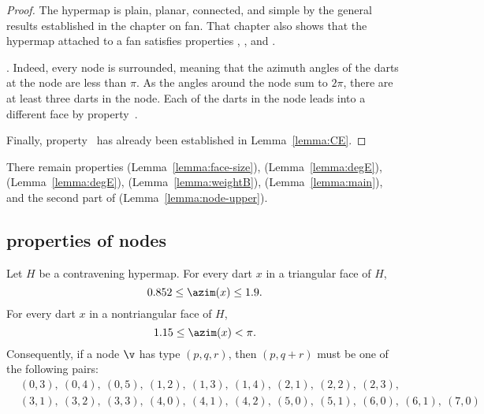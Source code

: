 \begin{proof}
  The hypermap is plain, planar, connected, and simple by the general
  results established in the chapter on fan.  That chapter also shows
  that the hypermap attached to a fan satisfies properties
  , , and .

  .  Indeed, every node is
  surrounded, meaning that the azimuth angles of the darts at the
  node are less than $\pi$.  As the angles around the node sum to
  $2\pi$, there are at least three darts in the node. Each of the
  darts in the node leads into a different face by
  property~.

  Finally, property~ has already been established in
  Lemma~\ref{lemma:CE}.
\end{proof}

There remain properties 
(Lemma~\ref{lemma:face-size}), %
 (Lemma~\ref{lemma:degE}), 
(Lemma~\ref{lemma:degE}), 
(Lemma~\ref{lemma:weightB}), 
(Lemma~\ref{lemma:main}), and the second part of 
(Lemma~\ref{lemma:node-upper}).


\subsection{properties of nodes}
%



\begin{lemma}[] \label{lemma:0.852}
Let $H$ be a contravening
hypermap. For every dart $x$ in a triangular face of $H$,
\[ 0.852\le \azim(x)\le 1.9.\] 
For every dart $x$ in a nontriangular face of $H$, 
\[ 1.15\le\azim(x)<\pi.\] 
%
%
Consequently, if a node $\v$ has type $(p,q,r)$, then $(p,q+r)$ must
be one of the following pairs:
\begin{align*}
  &(0,3),~(0,4),~(0,5),~(1,2),~(1,3),~(1,4),~(2,1),~(2,2),~(2,3),\\
  &(3,1),~(3,2),~(3,3),~(4,0),~(4,1),~(4,2),
  ~(5,0),~(5,1),~(6,0),~(6,1),~(7,0)
\end{align*}
\end{lemma}
%

